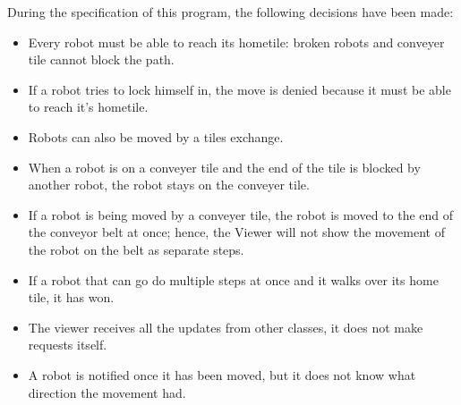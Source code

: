 During the specification of this program, the following decisions have been made:
\begin{itemize}
    \item Every robot must be able to reach its hometile: broken robots and conveyer tile cannot block the path.
    \item If a robot tries to lock himself in, the move is denied because it must be able to reach it's hometile.
    \item Robots can also be moved by a tiles exchange.
    \item When a robot is on a conveyer tile and the end of the tile is blocked by another robot, the robot stays on the conveyer tile.
    \item If a robot is being moved by a conveyer tile, the robot is moved to the end of the conveyor belt at once; hence, the Viewer will not show the movement of the robot on the belt as separate steps. 
    \item If a robot that can go do multiple steps at once and it walks over its home tile, it has won.
    \item The viewer receives all the updates from other classes, it does not make requests itself.
    \item A robot is notified once it has been moved, but it does not know what direction the movement had.
\end{itemize} 